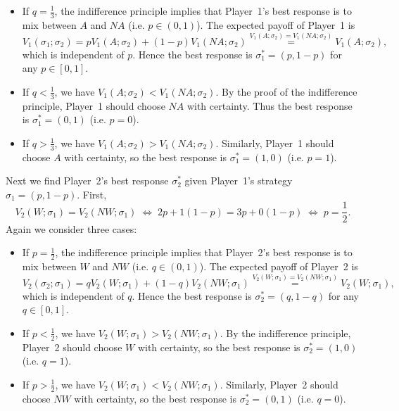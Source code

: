 \documentclass[twoside]{article}
\theoremstyle{definitionstyle}
\begin{document}
\begin{itemize}
\item If \(q = \frac{1}{3}\), the indifference principle implies that Player~1’s best response is to mix between \(A\) and \(NA\) (i.e. \(p \in (0,1)\)). The expected payoff of Player~1 is
\[
V_1(\sigma_1; \sigma_2) = pV_1(A; \sigma_2) + (1-p)V_1(NA; \sigma_2)
\overset{V_1(A;\sigma_2)=V_1(NA;\sigma_2)}{=} V_1(A; \sigma_2),
\]
which is independent of \(p\). Hence the best response is \(\sigma_1^* = (p, 1-p)\) for any \(p \in [0,1]\).

\item If \(q < \frac{1}{3}\), we have \(V_1(A; \sigma_2) < V_1(NA; \sigma_2)\). By the proof of the indifference principle, Player~1 should choose \(NA\) with certainty. Thus the best response is \(\sigma_1^* = (0,1)\) (i.e. \(p=0\)).

\item If \(q > \frac{1}{3}\), we have \(V_1(A; \sigma_2) > V_1(NA; \sigma_2)\). Similarly, Player~1 should choose \(A\) with certainty, so the best response is \(\sigma_1^* = (1,0)\) (i.e. \(p=1\)).
\end{itemize}
Next we find Player~2's best response \(\sigma_2^*\) given Player~1’s strategy \(\sigma_1 = (p, 1-p)\). First,
\[
V_2(W; \sigma_1) = V_2(NW; \sigma_1)
\;\Longleftrightarrow\;
2p + 1(1-p) = 3p + 0(1-p)
\;\Longleftrightarrow\;
p = \frac{1}{2}.
\]
Again we consider three cases:
\begin{itemize}
\item If \(p = \frac{1}{2}\), the indifference principle implies that Player~2’s best response is to mix between \(W\) and \(NW\) (i.e. \(q \in (0,1)\)). The expected payoff of Player~2 is
\[
V_2(\sigma_2; \sigma_1) = qV_2(W; \sigma_1) + (1-q)V_2(NW; \sigma_1)
\overset{V_2(W;\sigma_1)=V_2(NW;\sigma_1)}{=} V_2(W; \sigma_1),
\]
which is independent of \(q\). Hence the best response is \(\sigma_2^* = (q, 1-q)\) for any \(q \in [0,1]\).

\item If \(p < \frac{1}{2}\), we have \(V_2(W; \sigma_1) > V_2(NW; \sigma_1)\). By the indifference principle, Player~2 should choose \(W\) with certainty, so the best response is \(\sigma_2^* = (1,0)\) (i.e. \(q=1\)).

\item If \(p > \frac{1}{2}\), we have \(V_2(W; \sigma_1) < V_2(NW; \sigma_1)\). Similarly, Player~2 should choose \(NW\) with certainty, so the best response is \(\sigma_2^* = (0,1)\) (i.e. \(q=0\)).
\end{itemize}
\end{document}
